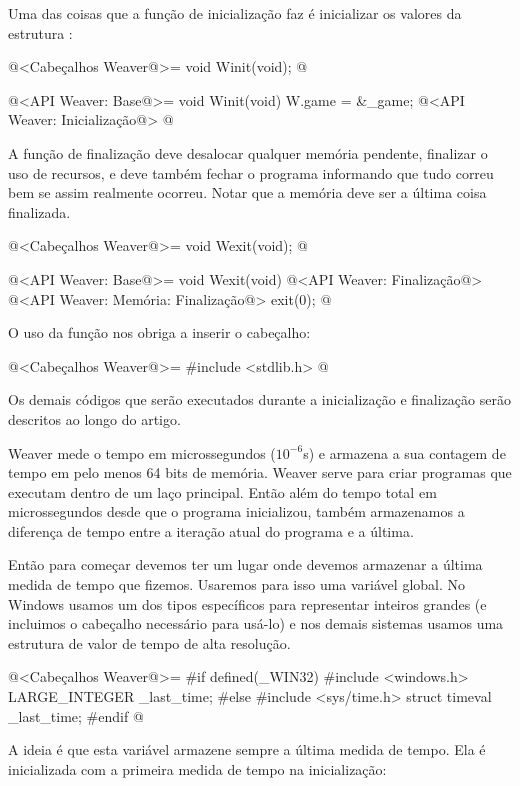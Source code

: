 
Uma das coisas que a função de inicialização faz é inicializar os
valores da estrutura :

\iniciocodigo
@<Cabeçalhos Weaver@>=
void Winit(void);
@
\fimcodigo

\iniciocodigo
@<API Weaver: Base@>=
void Winit(void){
  W.game = &_game;
  @<API Weaver: Inicialização@>
}
@
\fimcodigo

A função de finalização deve desalocar qualquer memória pendente,
finalizar o uso de recursos, e deve também fechar o programa
informando que tudo correu bem se assim realmente ocorreu. Notar que a
memória deve ser a última coisa finalizada.

\iniciocodigo
@<Cabeçalhos Weaver@>=
void Wexit(void);
@
\fimcodigo

\iniciocodigo
@<API Weaver: Base@>=
void Wexit(void){
  @<API Weaver: Finalização@>
  @<API Weaver: Memória: Finalização@>
  exit(0);
}
@
\fimcodigo

O uso da função  nos obriga a inserir o cabeçalho:

\iniciocodigo
@<Cabeçalhos Weaver@>=
#include <stdlib.h>
@
\fimcodigo

Os demais códigos que serão executados durante a inicialização e
finalização serão descritos ao longo do artigo.


Weaver mede o tempo em microssegundos ($10^{-6}$s) e armazena a sua
contagem de tempo em pelo menos 64 bits de memória. Weaver serve para
criar programas que executam dentro de um laço principal. Então além
do tempo total em microssegundos desde que o programa inicializou,
também armazenamos a diferença de tempo entre a iteração atual do
programa e a última.

Então para começar devemos ter um lugar onde devemos armazenar a
última medida de tempo que fizemos. Usaremos para isso uma variável
global. No Windows usamos um dos tipos específicos para representar
inteiros grandes (e incluimos o cabeçalho necessário para usá-lo)
e nos demais sistemas usamos uma estrutura de valor de tempo de
alta resolução.

\iniciocodigo
@<Cabeçalhos Weaver@>=
#if defined(_WIN32)
#include <windows.h>
LARGE_INTEGER _last_time;
#else
#include <sys/time.h>
struct timeval _last_time;
#endif
@
\fimcodigo

A ideia é que esta variável armazene sempre a última medida de
tempo. Ela é inicializada com a primeira medida de tempo na
inicialização:

